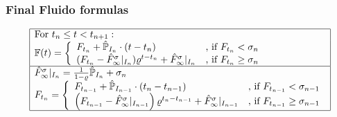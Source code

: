 \documentclass[a4paper,12pt]{scrartcl}
\newcounter{formula}
\begin{document}
\subsubsection{Final Fluido formulas}

$$
\begin{array}{|l|}
\hline
\mbox{For } t_n \leq t < t_{n+1}:\\
\mathbb{F}(t) = \left\{
\begin{array}{ll}
F_{t_n} + \hat{\mathbb{P}}_{I_n} \cdot (t - t_n) & \mbox{, if } F_{t_n} < \sigma_n\\
(F_{t_n} - \hat{F}^{\sigma}_{\infty}|_{I_n}) \varrho^{t-t_n} + \hat{F}^{\sigma}_{\infty}|_{I_n} & \mbox{, if } F_{t_n} \geq \sigma_n
\end{array}\right.
\\
\hline
\hat{F}^{\sigma}_{\infty}|_{I_n} = \frac{1}{1- \varrho} \hat{\mathbb{P}}_{I_n} + \sigma_n\\
F_{t_n} = \left\{
\begin{array}{ll}
F_{t_{n-1}} + \hat{\mathbb{P}}_{I_{n-1}} \cdot (t_n - t_{n-1}) & \mbox{, if } F_{t_{n-1}} < \sigma_{n-1}\\
\left(F_{t_{n-1}} - \hat{F}^{\sigma}_{\infty}|_{I_{n-1}}\right) \varrho^{t_n-t_{n-1}} + \hat{F}^{\sigma}_{\infty}|_{I_{n-1}} & \mbox{, if } F_{t_{n-1}} \geq \sigma_{n-1}
\end{array}\right.
\\
\hline
\end{array}$$
\end{document}
